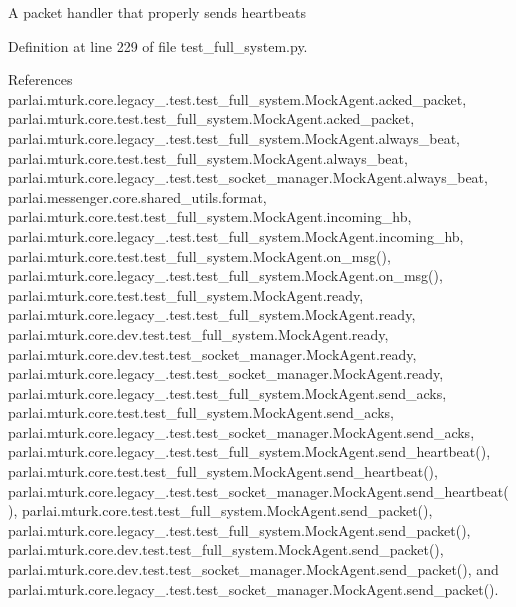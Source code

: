 \begin{DoxyVerb}A packet handler that properly sends heartbeats\end{DoxyVerb}
 

Definition at line 229 of file test\+\_\+full\+\_\+system.\+py.



References parlai.\+mturk.\+core.\+legacy\+\_.\+test.\+test\+\_\+full\+\_\+system.\+Mock\+Agent.\+acked\+\_\+packet, parlai.\+mturk.\+core.\+test.\+test\+\_\+full\+\_\+system.\+Mock\+Agent.\+acked\+\_\+packet, parlai.\+mturk.\+core.\+legacy\+\_.\+test.\+test\+\_\+full\+\_\+system.\+Mock\+Agent.\+always\+\_\+beat, parlai.\+mturk.\+core.\+test.\+test\+\_\+full\+\_\+system.\+Mock\+Agent.\+always\+\_\+beat, parlai.\+mturk.\+core.\+legacy\+\_.\+test.\+test\+\_\+socket\+\_\+manager.\+Mock\+Agent.\+always\+\_\+beat, parlai.\+messenger.\+core.\+shared\+\_\+utils.\+format, parlai.\+mturk.\+core.\+test.\+test\+\_\+full\+\_\+system.\+Mock\+Agent.\+incoming\+\_\+hb, parlai.\+mturk.\+core.\+legacy\+\_.\+test.\+test\+\_\+full\+\_\+system.\+Mock\+Agent.\+incoming\+\_\+hb, parlai.\+mturk.\+core.\+test.\+test\+\_\+full\+\_\+system.\+Mock\+Agent.\+on\+\_\+msg(), parlai.\+mturk.\+core.\+legacy\+\_.\+test.\+test\+\_\+full\+\_\+system.\+Mock\+Agent.\+on\+\_\+msg(), parlai.\+mturk.\+core.\+test.\+test\+\_\+full\+\_\+system.\+Mock\+Agent.\+ready, parlai.\+mturk.\+core.\+legacy\+\_.\+test.\+test\+\_\+full\+\_\+system.\+Mock\+Agent.\+ready, parlai.\+mturk.\+core.\+dev.\+test.\+test\+\_\+full\+\_\+system.\+Mock\+Agent.\+ready, parlai.\+mturk.\+core.\+dev.\+test.\+test\+\_\+socket\+\_\+manager.\+Mock\+Agent.\+ready, parlai.\+mturk.\+core.\+legacy\+\_.\+test.\+test\+\_\+socket\+\_\+manager.\+Mock\+Agent.\+ready, parlai.\+mturk.\+core.\+legacy\+\_.\+test.\+test\+\_\+full\+\_\+system.\+Mock\+Agent.\+send\+\_\+acks, parlai.\+mturk.\+core.\+test.\+test\+\_\+full\+\_\+system.\+Mock\+Agent.\+send\+\_\+acks, parlai.\+mturk.\+core.\+legacy\+\_.\+test.\+test\+\_\+socket\+\_\+manager.\+Mock\+Agent.\+send\+\_\+acks, parlai.\+mturk.\+core.\+legacy\+\_.\+test.\+test\+\_\+full\+\_\+system.\+Mock\+Agent.\+send\+\_\+heartbeat(), parlai.\+mturk.\+core.\+test.\+test\+\_\+full\+\_\+system.\+Mock\+Agent.\+send\+\_\+heartbeat(), parlai.\+mturk.\+core.\+legacy\+\_.\+test.\+test\+\_\+socket\+\_\+manager.\+Mock\+Agent.\+send\+\_\+heartbeat(), parlai.\+mturk.\+core.\+test.\+test\+\_\+full\+\_\+system.\+Mock\+Agent.\+send\+\_\+packet(), parlai.\+mturk.\+core.\+legacy\+\_.\+test.\+test\+\_\+full\+\_\+system.\+Mock\+Agent.\+send\+\_\+packet(), parlai.\+mturk.\+core.\+dev.\+test.\+test\+\_\+full\+\_\+system.\+Mock\+Agent.\+send\+\_\+packet(), parlai.\+mturk.\+core.\+dev.\+test.\+test\+\_\+socket\+\_\+manager.\+Mock\+Agent.\+send\+\_\+packet(), and parlai.\+mturk.\+core.\+legacy\+\_.\+test.\+test\+\_\+socket\+\_\+manager.\+Mock\+Agent.\+send\+\_\+packet().



